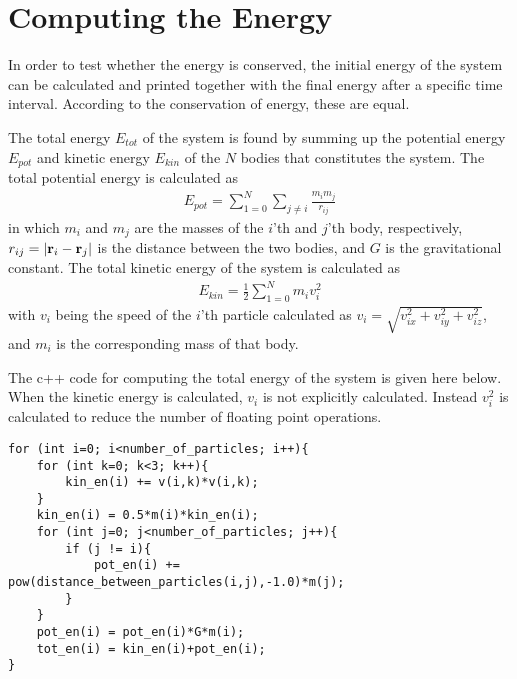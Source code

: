 \section{Computing the Energy}
\label{sec:ComputingEnergy}
In order to test whether the energy is conserved, the initial energy of the system can be calculated and printed together with the final energy after a specific time interval.
According to the conservation of energy, these are equal. 

The total energy $E_{tot}$ of the system is found by summing up the potential energy $E_{pot}$ and kinetic energy $E_{kin}$ of the $N$ bodies that constitutes the system.
The total potential energy is calculated as 
\begin{align}
	E_{pot} = \sum _{1=0} ^N \sum _{j \neq i} \frac{m_i m_j}{r_{ij}}
\end{align}
in which $m_i$ and $m_j$ are the masses of the $i$'th and $j$'th body, respectively, $r_{ij} = | \mbox{\textbf{r}}_i - \mbox{\textbf{r}}_j |$ is the distance between the two bodies, and $G$ is the gravitational constant. 
The total kinetic energy of the system is calculated as 
\begin{align}
	E_{kin} = \frac{1}{2} \sum _{1=0} ^N m_i v_i ^2
\end{align}
with $v_i$ being the speed of the $i$'th particle calculated as 
$v_i = \sqrt{v_{ix}^2 +v_{iy}^2 +v_{iz}^2}$, and $m_i$ is the corresponding mass of that body. 

The c++ code for computing the total energy of the system is given here below.
When the kinetic energy is calculated, $v_i$ is not explicitly calculated. Instead $v_i^2$ is calculated to reduce the number of floating point operations. 
\begin{lstlisting}
for (int i=0; i<number_of_particles; i++){
	for (int k=0; k<3; k++){
    	kin_en(i) += v(i,k)*v(i,k);
    }
    kin_en(i) = 0.5*m(i)*kin_en(i);
    for (int j=0; j<number_of_particles; j++){
        if (j != i){
        	pot_en(i) += pow(distance_between_particles(i,j),-1.0)*m(j);
        }
    }
    pot_en(i) = pot_en(i)*G*m(i);
    tot_en(i) = kin_en(i)+pot_en(i);
}
\end{lstlisting}
